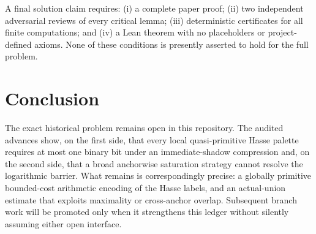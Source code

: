 \documentclass[11pt]{article}
\theoremstyle{definition}
\theoremstyle{remark}
\begin{document}
A final solution claim requires: (i) a complete paper proof; (ii) two independent
adversarial reviews of every critical lemma; (iii) deterministic certificates for all
finite computations; and (iv) a Lean theorem with no placeholders or project-defined
axioms.  None of these conditions is presently asserted to hold for the full problem.

\section{Conclusion}

The exact historical problem remains open in this repository.  The audited advances
show, on the first side, that every local quasi-primitive Hasse palette requires at most
one binary bit under an immediate-shadow compression and, on the second side, that a broad
anchorwise saturation strategy cannot resolve the logarithmic barrier.  What remains is
correspondingly precise: a globally primitive bounded-cost arithmetic encoding of the
Hasse labels, and an actual-union estimate that exploits maximality or cross-anchor
overlap.  Subsequent branch work will be promoted only when it strengthens this ledger
without silently assuming either open interface.



\end{document}
